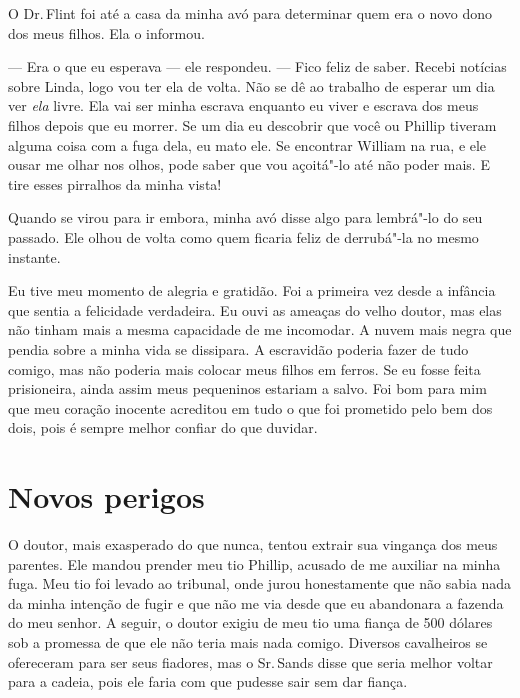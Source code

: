 O Dr.\,Flint foi até a casa da minha avó
para determinar quem era o novo dono dos meus filhos. Ela o informou.

--- Era o que eu esperava --- ele respondeu. --- Fico feliz de saber.
Recebi notícias sobre Linda, logo vou ter ela de volta. Não se dê ao
trabalho de esperar um dia ver \emph{ela} livre. Ela vai ser minha
escrava enquanto eu viver e escrava dos meus filhos depois que eu
morrer. Se um dia eu descobrir que você ou Phillip tiveram alguma coisa
com a fuga dela, eu mato ele. Se encontrar William na rua, e ele ousar
me olhar nos olhos, pode saber que vou açoitá"-lo até não poder mais. E
tire esses pirralhos da minha vista!

Quando se virou para ir embora, minha
avó disse algo para lembrá"-lo do seu passado. Ele olhou de volta como
quem ficaria feliz de derrubá"-la no mesmo instante.

Eu tive meu momento de alegria e
gratidão. Foi a primeira vez desde a infância que sentia a felicidade
verdadeira. Eu ouvi as ameaças do velho doutor, mas elas não tinham mais
a mesma capacidade de me incomodar. A nuvem mais negra que pendia sobre
a minha vida se dissipara. A escravidão poderia fazer de tudo comigo,
mas não poderia mais colocar meus filhos em ferros. Se eu fosse feita
prisioneira, ainda assim meus pequeninos estariam a salvo. Foi bom para
mim que meu coração inocente acreditou em tudo o que foi prometido pelo
bem dos dois, pois é sempre melhor confiar do que duvidar.

\chapter*{Novos perigos}

O doutor, mais exasperado do que nunca,
tentou extrair sua vingança dos meus parentes. Ele mandou prender meu
tio Phillip, acusado de me auxiliar na minha fuga. Meu tio foi levado ao
tribunal, onde jurou honestamente que não sabia nada da minha intenção
de fugir e que não me via desde que eu abandonara a fazenda do meu
senhor. A seguir, o doutor exigiu de meu tio uma fiança de 500 dólares
sob a promessa de que ele não teria mais nada comigo. Diversos
cavalheiros se ofereceram para ser seus fiadores, mas o Sr.\,Sands disse
que seria melhor voltar para a cadeia, pois ele faria com que pudesse
sair sem dar fiança.

